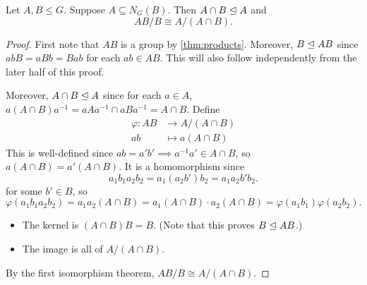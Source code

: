 \begin{theorem} \label{thm:iso:2}
    Let $A, B \le G$.
    Suppose $A \subseteq N_G(B)$.
    Then $A \cap B \trianglelefteq A$ and \[
        AB/B \cong A/(A \cap B).
    \]
\end{theorem}
\begin{proof}
    First note that $AB$ is a group by \cref{thm:products}.
    Moreover, $B \trianglelefteq AB$ since $abB = aBb = Bab$ for each $ab \in AB$.
    This will also follow independently from the later half of this proof.

    Moreover, $A \cap B \trianglelefteq A$ since for each $a \in A$,
    $a(A \cap B)a^{-1} = aAa^{-1} \cap aBa^{-1} = A \cap B$.
    Define \begin{align*}
        \varphi\colon AB &\to A/(A \cap B) \\
        ab &\mapsto a(A \cap B)
    \end{align*}
    This is well-defined since $ab = a'b' \implies a^{-1}a' \in A \cap B$,
    so $a(A \cap B) = a'(A \cap B)$.
    It is a homomorphism since \[
        a_1b_1a_2b_2 = a_1(a_2b')b_2 = a_1 a_2 b' b_2.
    \] for some $b' \in B$, so \[
        \varphi(a_1b_1 a_2b_2) = a_1a_2 (A \cap B)
        = a_1(A \cap B) \cdot a_2(A \cap B)
        = \varphi(a_1b_1) \varphi(a_2b_2).
    \]
    \begin{itemize}
        \item The kernel is $(A \cap B) B = B$.
        (Note that this proves $B \trianglelefteq AB$.)
        \item The image is all of $A/(A \cap B)$.
    \end{itemize}
    By the first isomorphism theorem, $AB/B \cong A/(A \cap B)$.
\end{proof}
